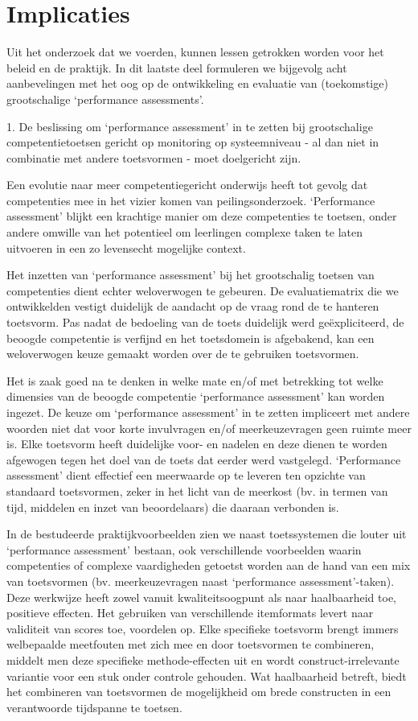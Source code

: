 \documentclass[
  letterpaper,
]{report}
\begin{document}
\hypertarget{implicaties}{%
\chapter{Implicaties}\label{implicaties}}

Uit het onderzoek dat we voerden, kunnen lessen getrokken worden voor
het beleid en de praktijk. In dit laatste deel formuleren we bijgevolg
acht aanbevelingen met het oog op de ontwikkeling en evaluatie van
(toekomstige) grootschalige `performance assessments'.

{ 1. De beslissing om `performance assessment' in te zetten bij
grootschalige competentietoetsen gericht op monitoring op systeemniveau
- al dan niet in combinatie met andere toetsvormen - moet doelgericht
zijn. }

Een evolutie naar meer competentiegericht onderwijs heeft tot gevolg dat
competenties mee in het vizier komen van peilingsonderzoek. `Performance
assessment' blijkt een krachtige manier om deze competenties te toetsen,
onder andere omwille van het potentieel om leerlingen complexe taken te
laten uitvoeren in een zo levensecht mogelijke context.

Het inzetten van `performance assessment' bij het grootschalig toetsen
van competenties dient echter weloverwogen te gebeuren. De
evaluatiematrix die we ontwikkelden vestigt duidelijk de aandacht op de
vraag rond de te hanteren toetsvorm. Pas nadat de bedoeling van de toets
duidelijk werd geëxpliciteerd, de beoogde competentie is verfijnd en het
toetsdomein is afgebakend, kan een weloverwogen keuze gemaakt worden
over de te gebruiken toetsvormen.

Het is zaak goed na te denken in welke mate en/of met betrekking tot
welke dimensies van de beoogde competentie `performance assessment' kan
worden ingezet. De keuze om `performance assessment' in te zetten
impliceert met andere woorden niet dat voor korte invulvragen en/of
meerkeuzevragen geen ruimte meer is. Elke toetsvorm heeft duidelijke
voor- en nadelen en deze dienen te worden afgewogen tegen het doel van
de toets dat eerder werd vastgelegd. `Performance assessment' dient
effectief een meerwaarde op te leveren ten opzichte van standaard
toetsvormen, zeker in het licht van de meerkost (bv. in termen van tijd,
middelen en inzet van beoordelaars) die daaraan verbonden is.

In de bestudeerde praktijkvoorbeelden zien we naast toetssystemen die
louter uit `performance assessment' bestaan, ook verschillende
voorbeelden waarin competenties of complexe vaardigheden getoetst worden
aan de hand van een mix van toetsvormen (bv. meerkeuzevragen naast
`performance assessment'-taken). Deze werkwijze heeft zowel vanuit
kwaliteitsoogpunt als naar haalbaarheid toe, positieve effecten. Het
gebruiken van verschillende itemformats levert naar validiteit van
scores toe, voordelen op. Elke specifieke toetsvorm brengt immers
welbepaalde meetfouten met zich mee en door toetsvormen te combineren,
middelt men deze specifieke methode-effecten uit en wordt
construct-irrelevante variantie voor een stuk onder controle gehouden.
Wat haalbaarheid betreft, biedt het combineren van toetsvormen de
mogelijkheid om brede constructen in een verantwoorde tijdspanne te
toetsen.
\end{document}
